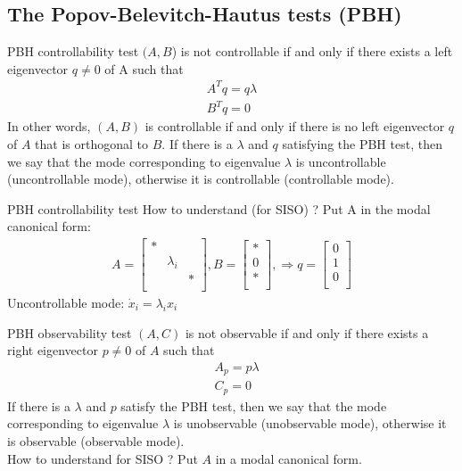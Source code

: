 \subsection{The Popov-Belevitch-Hautus tests (PBH)}
\begin{frame}{PBH controllability test}
$(A,B$) is not controllable if and only if there exists a left
eigenvector $q \neq 0$ of A such that
\begin{align*}
A^Tq=q\lambda \\
B^Tq=0
\end{align*}
In other words, $(A,B)$ is controllable if and only if there is
no left eigenvector $q$ of $A$ that is orthogonal to $B$.
If there is a $\lambda$ and $q$ satisfying the PBH test, then we
say that the mode corresponding to eigenvalue $\lambda$ is uncontrollable
(uncontrollable mode), otherwise it is controllable
(controllable mode).
\end{frame}

\begin{frame}{PBH controllability test}
How to understand (for SISO) ? Put A in the modal canonical
form:
\begin{align*}
A=\begin{bmatrix}
    *&&\\
    &\lambda_i&\\
    &&*\\
  \end{bmatrix}
,B= \begin{bmatrix}
    *\\
    0\\
    *\\
  \end{bmatrix}
,\Rightarrow q= \begin{bmatrix}
                0\\
                1\\
                0\\
               \end{bmatrix}
\end{align*}
Uncontrollable mode: $\dot{x}_i = \lambda_ix_i$
\end{frame}

\begin{frame}{PBH observability test}
$(A,C)$ is not observable if and only if there exists a right
eigenvector $p \neq 0$ of $A$ such that
\begin{align*}
&A_p = p\lambda\\
&C_p = 0
\end{align*}
If there is a $\lambda$ and $p$ satisfy the PBH test, then we say that
the mode corresponding to eigenvalue $\lambda$ is unobservable
(unobservable mode), otherwise it is observable (observable
mode).\\
\vspace{0.2cm}
How to understand for SISO ? Put $A$ in a modal canonical
form.
\end{frame}



